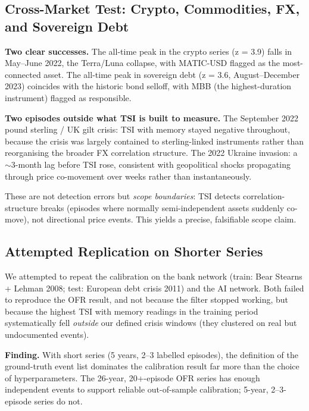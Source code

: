 \documentclass[11pt,a4paper]{article}
\begin{document}
\subsection{Cross-Market Test: Crypto, Commodities, FX, and Sovereign Debt}

\textbf{Two clear successes.} The all-time peak in the crypto series
(z = 3.9) falls in May--June 2022, the Terra/Luna collapse, with
MATIC-USD flagged as the most-connected asset. The all-time peak in
sovereign debt (z = 3.6, August--December 2023) coincides with the historic
bond selloff, with MBB (the highest-duration instrument) flagged as
responsible.

\textbf{Two episodes outside what TSI is built to measure.} The
September 2022 pound sterling / UK gilt crisis: TSI with memory stayed
negative throughout, because the crisis was largely contained to
sterling-linked instruments rather than reorganising the broader FX
correlation structure. The 2022 Ukraine invasion: a $\sim$3-month lag before
TSI rose, consistent with geopolitical shocks propagating through
price co-movement over weeks rather than instantaneously.

These are not detection errors but \emph{scope boundaries}: TSI detects
correlation-structure breaks (episodes where normally semi-independent assets
suddenly co-move), not directional price events. This yields a precise,
falsifiable scope claim.


\subsection{Attempted Replication on Shorter Series}

We attempted to repeat the calibration on the bank network (train:
Bear Stearns + Lehman 2008; test: European debt crisis 2011) and the AI
network. Both failed to reproduce the OFR result, and not because the filter
stopped working, but because the highest TSI with memory readings in
the training period systematically fell \emph{outside} our defined crisis
windows (they clustered on real but undocumented events).

\textbf{Finding.} With short series (5 years, 2--3 labelled episodes), the
definition of the ground-truth event list dominates the calibration result
far more than the choice of hyperparameters. The 26-year, 20+-episode OFR
series has enough independent events to support reliable out-of-sample
calibration; 5-year, 2--3-episode series do not.
\end{document}
